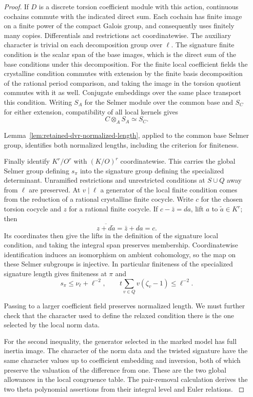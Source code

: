 \begin{proof}
If \(D\) is a discrete torsion coefficient module with this
action, continuous cochains commute with the indicated direct
sum. Each cochain has finite image on a finite power of the
compact Galois group, and consequently uses finitely many
copies. Differentials and restrictions act coordinatewise.
The auxiliary character is trivial on each decomposition group
over \(\ell\). The signature finite condition is the scalar span
of the base images, which is the direct sum of the base
conditions under this decomposition. For the finite local
coefficient fields the crystalline condition commutes with
extension by the finite basis decomposition of the rational
period comparison, and taking the image in the torsion quotient
commutes with it as well. Conjugate embeddings over the same
place transport this condition. Writing \(S_A\) for the Selmer module over the common base and \(S_C\) for either extension, compatibility of all local kernels gives
\[
 C\otimes_A S_A\simeq S_C.
\]

Lemma~\ref{lem:retained-dvr-normalized-length}, applied to the common
base Selmer group, identifies both normalized lengths, including the
criterion for finiteness.

Finally identify \(K^r/O^r\) with \((K/O)^r\) coordinatewise.
This carries the global Selmer group defining \(s_\pi\) into
the signature group defining the specialized determinant.
Unramified restrictions and unrestricted conditions at
\(S\cup Q\) away from \(\ell\) are preserved. At
\(v\mid\ell\) a generator of the local finite condition
comes from the reduction of a rational crystalline finite
cocycle. Write \(c\) for the chosen torsion cocycle and \(z\) for a rational finite cocycle. If \(c-\bar z=d a\), lift \(a\) to \(\tilde a\in K^r\); then
\[
 \overline{z+d\tilde a}=\bar z+d a=c .
\] Its coordinates then give the lifts in
the definition of the signature local condition, and taking
the integral span preserves membership. Coordinatewise
identification induces an isomorphism on ambient cohomology,
so the map on these Selmer subgroups is injective. In
particular finiteness of the specialized signature length
gives finiteness at \(\pi\) and
\[
          s_\pi\le \nu_\ell+\ell^{-2},
       \qquad t\sum_{v\in Q} v(\zeta_v-1)\le\ell^{-2}.
\]

Passing to a larger coefficient field preserves normalized length. We must further check that the character used to define the relaxed condition there is the one selected by the local norm data.

For the second inequality, the generator selected in the
marked model has full inertia image. The character of the
norm data and the twisted signature have the same character
values up to coefficient embedding and inversion, both of
which preserve the valuation of the difference from one.
These are the two global allowances in the local congruence
table. The pair-removal calculation derives the two theta polynomial assertions from their integral level and Euler relations. \label{cor:retained-twist-2}
\end{proof}

